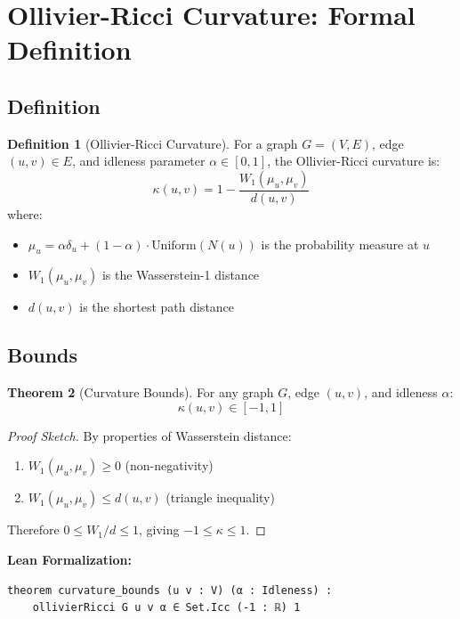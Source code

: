 \documentclass[11pt,a4paper]{article}
\theoremstyle{definition}
\newtheorem{theorem}{Theorem}[section]
\newtheorem{definition}[theorem]{Definition}
\begin{document}
\section{Ollivier-Ricci Curvature: Formal Definition}

\subsection{Definition}

\begin{definition}[Ollivier-Ricci Curvature]
For a graph $G = (V, E)$, edge $(u, v) \in E$, and idleness parameter $\alpha \in [0, 1]$, the Ollivier-Ricci curvature is:
\begin{equation}
\kappa(u, v) = 1 - \frac{W_1(\mu_u, \mu_v)}{d(u,v)}
\end{equation}
where:
\begin{itemize}
    \item $\mu_u = \alpha \delta_u + (1-\alpha) \cdot \text{Uniform}(N(u))$ is the probability measure at $u$
    \item $W_1(\mu_u, \mu_v)$ is the Wasserstein-1 distance
    \item $d(u,v)$ is the shortest path distance
\end{itemize}
\end{definition}

\subsection{Bounds}

\begin{theorem}[Curvature Bounds]
For any graph $G$, edge $(u, v)$, and idleness $\alpha$:
\begin{equation}
\kappa(u, v) \in [-1, 1]
\end{equation}
\end{theorem}

\begin{proof}[Proof Sketch]
By properties of Wasserstein distance:
\begin{enumerate}
    \item $W_1(\mu_u, \mu_v) \geq 0$ (non-negativity)
    \item $W_1(\mu_u, \mu_v) \leq d(u,v)$ (triangle inequality)
\end{enumerate}
Therefore $0 \leq W_1/d \leq 1$, giving $-1 \leq \kappa \leq 1$.
\end{proof}

\textbf{Lean Formalization:}
\begin{verbatim}
theorem curvature_bounds (u v : V) (α : Idleness) :
    ollivierRicci G u v α ∈ Set.Icc (-1 : ℝ) 1
\end{verbatim}
\end{document}
